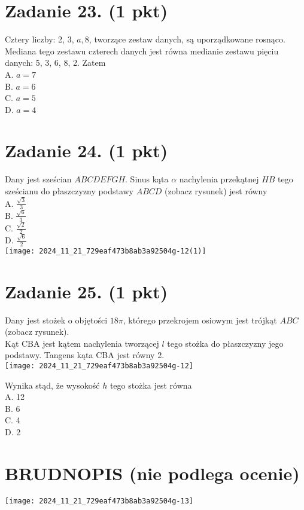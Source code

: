\documentclass[10pt]{article}
\begin{document}
\section*{Zadanie 23. (1 pkt)}
Cztery liczby: 2, 3, \(a, 8\), tworzące zestaw danych, są uporządkowane rosnąco. Mediana tego zestawu czterech danych jest równa medianie zestawu pięciu danych: 5, 3, 6, 8, 2. Zatem\\
A. \(a=7\)\\
B. \(a=6\)\\
C. \(a=5\)\\
D. \(a=4\)

\section*{Zadanie 24. (1 pkt)}
Dany jest sześcian \(A B C D E F G H\). Sinus kąta \(\alpha\) nachylenia przekątnej \(H B\) tego sześcianu do płaszczyzny podstawy \(A B C D\) (zobacz rysunek) jest równy\\
A. \(\frac{\sqrt{3}}{3}\)\\
B. \(\frac{\sqrt{6}}{3}\)\\
C. \(\frac{\sqrt{2}}{2}\)\\
D. \(\frac{\sqrt{6}}{2}\)\\
\texttt{[image: 2024\_11\_21\_729eaf473b8ab3a92504g-12(1)]}

\section*{Zadanie 25. (1 pkt)}
Dany jest stożek o objętości \(18 \pi\), którego przekrojem osiowym jest trójkąt \(A B C\) (zobacz rysunek).\\
Kąt CBA jest kątem nachylenia tworzącej \(l\) tego stożka do płaszczyzny jego podstawy. Tangens kąta CBA jest równy 2.\\
\texttt{[image: 2024\_11\_21\_729eaf473b8ab3a92504g-12]}

Wynika stąd, że wysokość \(h\) tego stożka jest równa\\
A. 12\\
B. 6\\
C. 4\\
D. 2

\section*{BRUDNOPIS (nie podlega ocenie)}
\begin{center}
\texttt{[image: 2024\_11\_21\_729eaf473b8ab3a92504g-13]}
\end{center}
\end{document}
